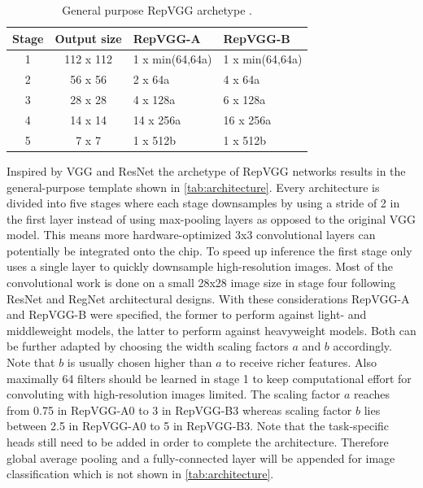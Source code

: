 \setlength{\tabcolsep}{5pt}
\begin{table}
	\begin{center}
		\begin{tabular}{c|c|l|l} 
			\hline
			Stage & Output size & RepVGG-A & RepVGG-B \\
			\hline
			1 & 112 x 112 & 1 x min(64,64a) & 1 x min(64,64a) \\
			2 & 56 x 56 & 2 x 64a & 4 x 64a \\
			3 & 28 x 28 & 4 x 128a & 6 x 128a \\
			4 & 14 x 14 & 14 x 256a & 16 x 256a \\
			5 & 7 x 7 & 1 x 512b & 1 x 512b \\
			\hline
		\end{tabular}
	\end{center}
	\caption{General purpose RepVGG archetype \cite{XiaohanDing.2021}.}
	\label{tab:architecture}
\end{table}
\setlength{\tabcolsep}{6pt}

Inspired by VGG \cite{KarenSimonyan.2014} and ResNet \cite{KaimingHe.2015} the archetype of RepVGG networks results in the general-purpose template shown in \autoref{tab:architecture}. Every architecture is divided into five stages where each stage downsamples by using a stride of 2 in the first layer instead of using max-pooling layers as opposed to the original VGG model. This means more hardware-optimized 3x3 convolutional layers can potentially be integrated onto the chip. To speed up inference the first stage only uses a single layer to quickly downsample high-resolution images. Most of the convolutional work is done on a small 28x28 image size in stage four following ResNet \cite{KaimingHe.2015} and RegNet \cite{IlijaRadosavovic.2020} architectural designs. With these considerations RepVGG-A and RepVGG-B were specified, the former to perform against light- and middleweight models, the latter to perform against heavyweight models. Both can be further adapted by choosing the width scaling factors $a$ and $b$ accordingly. Note that $b$ is usually chosen higher than $a$ to receive richer features. Also maximally 64 filters should be learned in stage 1 to keep computational effort for convoluting with high-resolution images limited. The scaling factor $a$ reaches from 0.75 in RepVGG-A0 to 3 in RepVGG-B3 whereas scaling factor $b$ lies between 2.5 in RepVGG-A0 to 5 in RepVGG-B3. Note that the task-specific heads still need to be added in order to complete the architecture. Therefore global average pooling and a fully-connected layer will be appended for image classification which is not shown in \autoref{tab:architecture}. 

